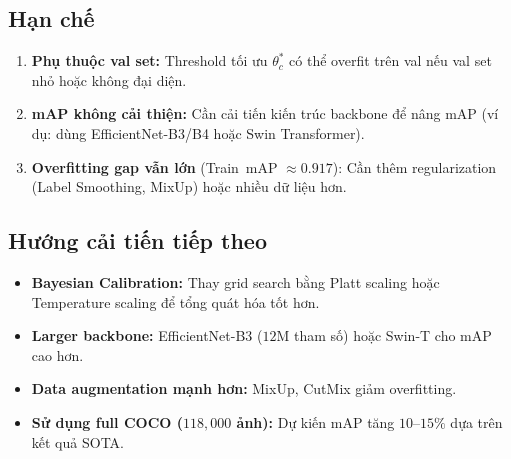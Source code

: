 \documentclass{article}
\begin{document}
\subsection{Hạn chế}
\begin{enumerate}[leftmargin=2em]
  \item \textbf{Phụ thuộc val set:} Threshold tối ưu $\theta_c^*$ có thể
        overfit trên val nếu val set nhỏ hoặc không đại diện.
  \item \textbf{mAP không cải thiện:} Cần cải tiến kiến trúc backbone để
        nâng mAP (ví dụ: dùng EfficientNet-B3/B4 hoặc Swin Transformer).
  \item \textbf{Overfitting gap vẫn lớn} (Train~mAP $\approx 0.917$):
        Cần thêm regularization (Label Smoothing, MixUp) hoặc nhiều dữ liệu hơn.
\end{enumerate}

\subsection{Hướng cải tiến tiếp theo}
\begin{itemize}[leftmargin=1.8em]
  \item \textbf{Bayesian Calibration:} Thay grid search bằng
        Platt scaling hoặc Temperature scaling để tổng quát hóa tốt hơn.
  \item \textbf{Larger backbone:} EfficientNet-B3 ($12\text{M}$ tham số)
        hoặc Swin-T cho mAP cao hơn.
  \item \textbf{Data augmentation mạnh hơn:} MixUp, CutMix giảm overfitting.
  \item \textbf{Sử dụng full COCO ($118{,}000$ ảnh):} Dự kiến mAP tăng
        $10$--$15\%$ dựa trên kết quả SOTA.
\end{itemize}



\end{document}

